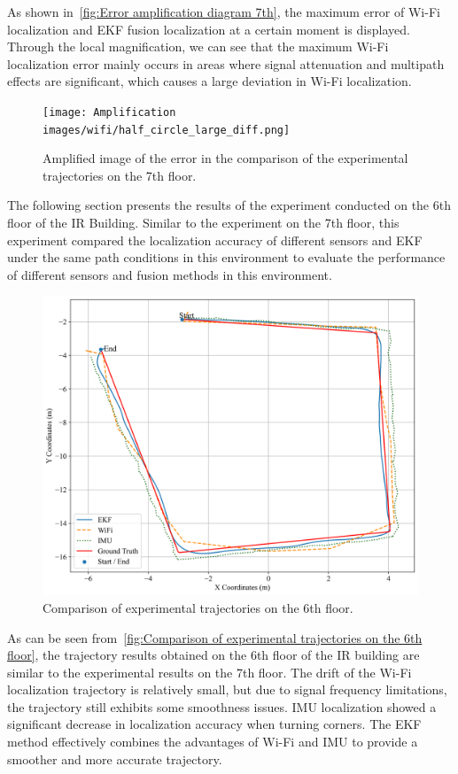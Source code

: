 \documentclass[12pt,a4paper]{article}
\numberwithin{equation}{section}
\begin{document}
As shown in~\autoref{fig:Error amplification diagram 7th}, the maximum error of
Wi-Fi localization and EKF fusion localization at a certain moment is
displayed. Through the local magnification, we can see that the maximum Wi-Fi
localization error mainly occurs in areas where signal attenuation and multipath
effects are significant, which causes a large deviation in Wi-Fi localization.
\begin{figure}[H]
  \centering
  \texttt{[image: Amplification
    images/wifi/half\_circle\_large\_diff.png]}
  \caption{Amplified image of the error in the comparison of the experimental
    trajectories on the 7th floor.}
  \label{fig:Error amplification diagram 7th}
\end{figure}

The following section presents the results of the experiment conducted on the
6th floor of the IR Building. Similar to the experiment on the 7th floor, this
experiment compared the localization accuracy of different sensors and EKF under
the same path conditions in this environment to evaluate the performance of
different sensors and fusion methods in this environment.
\begin{figure}[H]
  \centering
  \includegraphics[width=0.7\linewidth]{images/1/4.png}
  \caption{Comparison of experimental trajectories on the 6th floor.}
  \label{fig:Comparison of experimental trajectories on the 6th floor}
\end{figure}

As can be seen from~\autoref{fig:Comparison of experimental trajectories on the
  6th floor}, the trajectory results obtained on the 6th floor of the IR
building are similar to the experimental results on the 7th floor. The drift of
the Wi-Fi localization trajectory is relatively small, but due to signal
frequency limitations, the trajectory still exhibits some smoothness issues. IMU
localization showed a significant decrease in localization accuracy when turning
corners. The EKF method effectively combines the advantages of Wi-Fi and IMU to
provide a smoother and more accurate trajectory.
\end{document}
